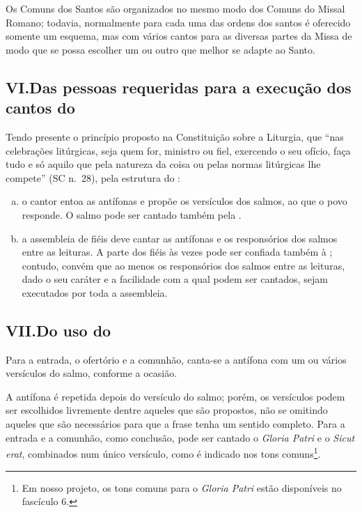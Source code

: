  Os Comuns dos Santos são organizados no mesmo modo dos Comuns do Missal Romano; todavia, normalmente para cada uma das ordens dos santos é oferecido somente um esquema, mas com vários cantos para as diversas partes da Missa de modo que se possa escolher um ou outro que melhor se adapte ao Santo.

\subsection{VI.\@ Das pessoas requeridas para a execução dos cantos do {\GS}}

 Tendo presente o princípio proposto na Constituição sobre a Liturgia, que ``nas celebrações litúrgicas, seja quem for, ministro ou fiel, exercendo o seu ofício, faça tudo e só aquilo que pela natureza da coisa ou pelas normas litúrgicas lhe compete'' (SC n.\ 28), pela estrutura do {\GS}:
\begin{enumerate}[a)]
  \item o cantor entoa as antífonas e propõe os versículos dos salmos, ao que o povo responde. O salmo pode ser cantado também pela {\Schola}.

  \item a assembleia de fiéis deve cantar as antífonas e os responsórios dos salmos entre as leituras. A parte dos fiéis às vezes pode ser confiada também à {\Schola}; contudo, convém que ao menos os responsórios dos salmos entre as leituras, dado o seu caráter e a facilidade com a qual podem ser cantados, sejam executados por toda a assembleia.
\end{enumerate}

\subsection{VII.\@ Do uso do {\GS}}
 Para a entrada, o ofertório e a comunhão, canta-se a antífona com um ou vários versículos do salmo, conforme a ocasião.

A antífona é repetida depois do versículo do salmo; porém, os versículos podem ser escolhidos livremente dentre aqueles que são propostos, não se omitindo aqueles que são necessários para que a frase tenha um sentido completo. Para a entrada e a comunhão, como conclusão, pode ser cantado o \textcolor{gregoriocolor}{\emph{Gloria Patri}} e o \textcolor{gregoriocolor}{\emph{Sicut erat}}, combinados num único versículo, como é indicado nos tons comuns\footnote{Em nosso projeto, os tons comuns para o \textcolor{gregoriocolor}{\emph{Gloria Patri}} estão disponíveis no fascículo 6.}.

